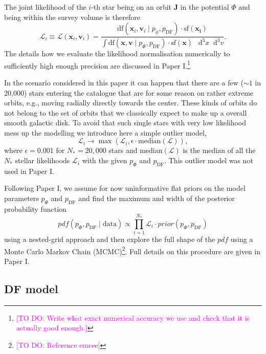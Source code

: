 \documentclass[iop,revtex4,numberedappendix,appendixfloats]{emulateapj}
\newcommand{\vect}[1]{\boldsymbol{#1}}
\newcommand*\Diff[1]{\mathop{}\!\mathrm{d^#1}}
\newcommand{\pdf}{\ensuremath{pdf}}
\newcommand{\Wilma}[1]{\textcolor{Magenta}{#1}}
\begin{document}
The joint likelihood of the $i$-th star being on an orbit $\vect{J}$ in the potential $\Phi$ and being within the survey volume is therefore
\begin{equation*}
\mathscr{L}_i \equiv \mathscr{L}(\vect{x}_i,\vect{v}_i) = \frac{\text{df}(\vect{x}_i,\vect{v}_i\mid p_\phi, p_\text{DF}) \cdot \text{sf}(\vect{x_i})}{\int \text{df}(\vect{x},\vect{v}\mid p_\Phi, p_\text{DF}) \cdot \text{sf}(\vect{x}) \ \Diff3 x \Diff3 v}.
\end{equation*}
The details how we evaluate the likelihood normalisation numerically to sufficiently high enough precision are discussed in Paper I.\footnote{\Wilma{[TO DO: Write what exact numerical accuracy we use and check that it is actually good enough.]}}

In the scenario considered in this paper it can happen that there are a few ($\sim 1$ in 20,000) stars entering the catalogue that are for some reason  on rather extreme orbits, e.g., moving radially directly towards the center. These kinds of orbits do not belong to the set of orbits that we classically expect to make up a overall smooth galactic disk. To avoid that such single stars with very low likelihood mess up the modelling we introduce here a simple outlier model,
\begin{equation*}
\mathscr{L}_i \longrightarrow \max \left( \mathscr{L}_i, \epsilon \cdot \text{median}(\mathscr{L})\right),
\end{equation*}
where $\epsilon = 0.001$ for $N_*=20,000$ stars and $\text{median}(\mathscr{L})$ is the median of all the $N_*$ stellar likelihoods $\mathscr{L}_i$ with the given $p_\Phi$ and $p_\text{DF}$. This outlier model was not used in Paper I.

Following Paper I, we assume for now uninformative flat priors on the model parameters $p_\Phi$ and $p_\text{DF}$ and find the maximum and width of the posterior probability function
\begin{equation*}
pdf(p_\Phi,p_\text{DF} \mid \text{data}) \propto \prod_{i=1}^{N_*} \mathscr{L}_i \cdot prior(p_\Phi,p_\text{DF})
\end{equation*}
using a nested-grid approach and then explore the full shape of the $\pdf$ using a Monte Carlo Markov Chain (MCMC)\footnote{\Wilma{[TO DO: Reference emcee]}}. Full details on this procedure are given in Paper I.

\subsection{DF model}
\end{document}
